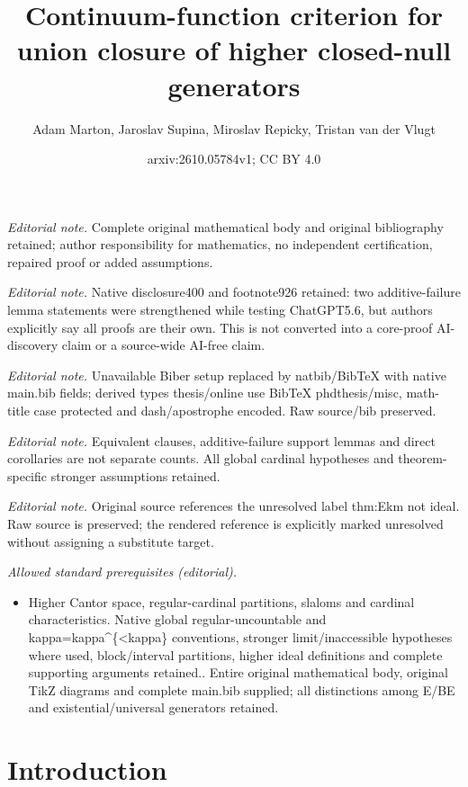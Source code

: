 \documentclass[10pt,a4paper]{amsart}
\title{Continuum-function criterion for union closure of higher closed-null generators}
\author{Adam Marton, Jaroslav Supina, Miroslav Repicky, Tristan van der Vlugt}
\date{arxiv:2610.05784v1; CC BY 4.0}
\theoremstyle{definition}
\begin{document}
\maketitle
\noindent\textit{Editorial note.} Complete original mathematical body and original bibliography retained; author responsibility for mathematics, no independent certification, repaired proof or added assumptions.\par\medskip
\noindent\textit{Editorial note.} Native disclosure400 and footnote926 retained: two additive-failure lemma statements were strengthened while testing ChatGPT5.6, but authors explicitly say all proofs are their own. This is not converted into a core-proof AI-discovery claim or a source-wide AI-free claim.\par\medskip
\noindent\textit{Editorial note.} Unavailable Biber setup replaced by natbib/BibTeX with native main.bib fields; derived types thesis/online use BibTeX phdthesis/misc, math-title case protected and dash/apostrophe encoded. Raw source/bib preserved.\par\medskip
\noindent\textit{Editorial note.} Equivalent clauses, additive-failure support lemmas and direct corollaries are not separate counts. All global cardinal hypotheses and theorem-specific stronger assumptions retained.\par\medskip
\noindent\textit{Editorial note.} Original source references the unresolved label thm:Ekm not ideal. Raw source is preserved; the rendered reference is explicitly marked unresolved without assigning a substitute target.\par\medskip
\noindent\textit{Allowed standard prerequisites (editorial).}\begin{itemize}
\item Higher Cantor space, regular-cardinal partitions, slaloms and cardinal characteristics. Native global regular-uncountable and kappa=kappa\textasciicircum{}\{<kappa\} conventions, stronger limit/inaccessible hypotheses where used, block/interval partitions, higher ideal definitions and complete supporting arguments retained.. Entire original mathematical body, original TikZ diagrams and complete main.bib supplied; all distinctions among E/BE and existential/universal generators retained.
\end{itemize}\medskip
	\section{Introduction}\label{sec:introduction}
	
\end{document}

